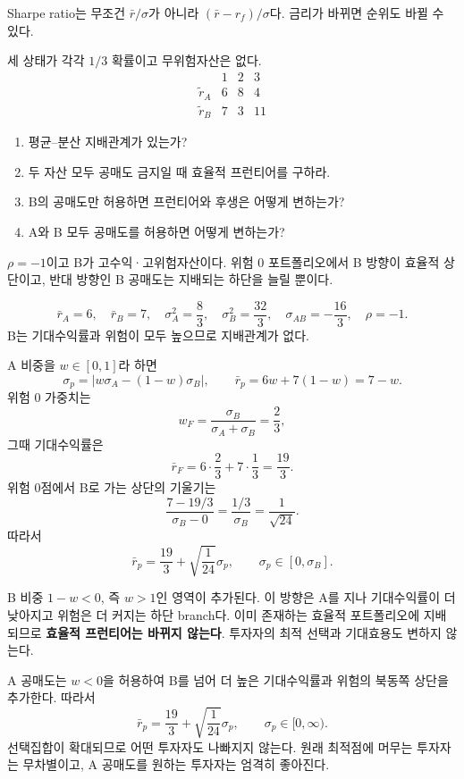 \begin{warningbox}
Sharpe ratio는 무조건 $\bar r/\sigma$가 아니라 \textbf{$(\bar r-r_f)/\sigma$}다. 금리가 바뀌면 순위도 바뀔 수 있다.
\end{warningbox}

\begin{officialbox}
세 상태가 각각 $1/3$ 확률이고 무위험자산은 없다.
\[
\begin{array}{c|ccc}
&1&2&3\\\hline
\widetilde r_A&6&8&4\\
\widetilde r_B&7&3&11
\end{array}
\]
\begin{enumerate}[label=(\alph*)]
\item 평균--분산 지배관계가 있는가?
\item 두 자산 모두 공매도 금지일 때 효율적 프런티어를 구하라.
\item B의 공매도만 허용하면 프런티어와 후생은 어떻게 변하는가?
\item A와 B 모두 공매도를 허용하면 어떻게 변하는가?
\end{enumerate}
\end{officialbox}

\begin{strategybox}
$\rho=-1$이고 B가 고수익·고위험자산이다. 위험 0 포트폴리오에서 B 방향이 효율적 상단이고, 반대 방향인 B 공매도는 지배되는 하단을 늘릴 뿐이다.
\end{strategybox}

\begin{solutionbox}
\[
\bar r_A=6,\quad\bar r_B=7,
\quad\sigma_A^2=\frac83,\quad\sigma_B^2=\frac{32}{3},
\quad\sigma_{AB}=-\frac{16}{3},\quad\rho=-1.
\]
B는 기대수익률과 위험이 모두 높으므로 지배관계가 없다.

A 비중을 $w\in[0,1]$라 하면
\[
\sigma_p=\left|w\sigma_A-(1-w)\sigma_B\right|,
\qquad
\bar r_p=6w+7(1-w)=7-w.
\]
위험 0 가중치는
\[
w_F=\frac{\sigma_B}{\sigma_A+\sigma_B}=\frac23,
\]
그때 기대수익률은
\[
\bar r_F=6\cdot\frac23+7\cdot\frac13=\frac{19}{3}.
\]
위험 0점에서 B로 가는 상단의 기울기는
\[
\frac{7-19/3}{\sigma_B-0}=\frac{1/3}{\sigma_B}=\frac1{\sqrt{24}}.
\]
따라서
\[
\boxed{\bar r_p=\frac{19}{3}+\sqrt{\frac1{24}}\sigma_p,\qquad
\sigma_p\in[0,\sigma_B]}.
\]

B 비중 $1-w<0$, 즉 $w>1$인 영역이 추가된다. 이 방향은 A를 지나 기대수익률이 더 낮아지고 위험은 더 커지는 하단 branch다. 이미 존재하는 효율적 포트폴리오에 지배되므로 \textbf{효율적 프런티어는 바뀌지 않는다}. 투자자의 최적 선택과 기대효용도 변하지 않는다.

A 공매도는 $w<0$을 허용하여 B를 넘어 더 높은 기대수익률과 위험의 북동쪽 상단을 추가한다. 따라서
\[
\boxed{\bar r_p=\frac{19}{3}+\sqrt{\frac1{24}}\sigma_p,\qquad
\sigma_p\in[0,\infty)}.
\]
선택집합이 확대되므로 어떤 투자자도 나빠지지 않는다. 원래 최적점에 머무는 투자자는 무차별이고, A 공매도를 원하는 투자자는 엄격히 좋아진다.
\end{solutionbox}

